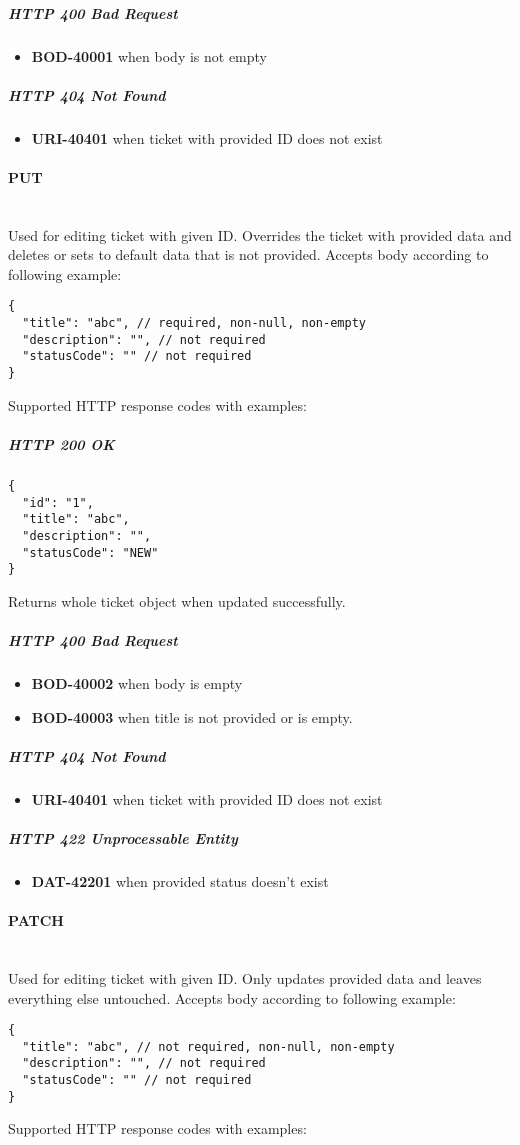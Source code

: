\documentclass[a4paper]{article}
\newcommand{\newLineParagraph}[1]{\paragraph{#1}\mbox{}\\}
\begin{document}
    \subparagraph{HTTP 400 Bad Request}
    \begin{itemize}
        \item \textbf{BOD-40001} when body is not empty
    \end{itemize}

    \subparagraph{HTTP 404 Not Found}
    \begin{itemize}
        \item \textbf{URI-40401} when ticket with provided ID does not exist
    \end{itemize}

    \newLineParagraph{PUT}
    Used for editing ticket with given ID. Overrides the ticket with provided data and deletes or sets to default data that is not provided. Accepts body according to following example:
    \begin{verbatim}
{
  "title": "abc", // required, non-null, non-empty
  "description": "", // not required
  "statusCode": "" // not required
}
    \end{verbatim}
    Supported HTTP response codes with examples:

    \subparagraph{HTTP 200 OK}
    \begin{verbatim}
{
  "id": "1",
  "title": "abc",
  "description": "",
  "statusCode": "NEW"
}
    \end{verbatim}
    Returns whole ticket object when updated successfully.

    \subparagraph{HTTP 400 Bad Request}
    \begin{itemize}
        \item \textbf{BOD-40002} when body is empty
        \item \textbf{BOD-40003} when title is not provided or is empty.
    \end{itemize}

    \subparagraph{HTTP 404 Not Found}
    \begin{itemize}
        \item \textbf{URI-40401} when ticket with provided ID does not exist
    \end{itemize}

    \subparagraph{HTTP 422 Unprocessable Entity}
    \begin{itemize}
        \item \textbf{DAT-42201} when provided status doesn't exist
    \end{itemize}

    \newLineParagraph{PATCH}
    Used for editing ticket with given ID. Only updates provided data and leaves everything else untouched. Accepts body according to following example:
    \begin{verbatim}
{
  "title": "abc", // not required, non-null, non-empty
  "description": "", // not required
  "statusCode": "" // not required
}
    \end{verbatim}
    Supported HTTP response codes with examples:
\end{document}
